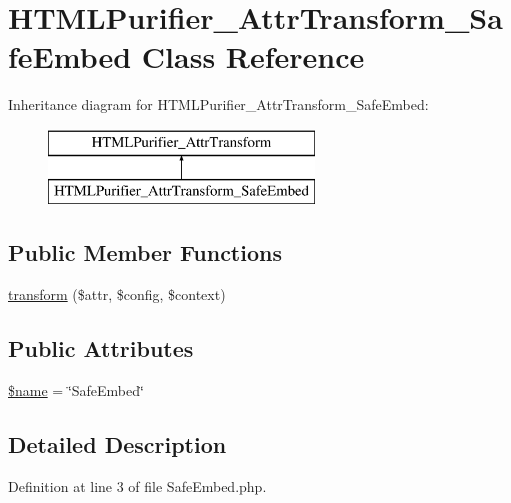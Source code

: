 \hypertarget{classHTMLPurifier__AttrTransform__SafeEmbed}{\section{H\+T\+M\+L\+Purifier\+\_\+\+Attr\+Transform\+\_\+\+Safe\+Embed Class Reference}
\label{classHTMLPurifier__AttrTransform__SafeEmbed}
}
Inheritance diagram for H\+T\+M\+L\+Purifier\+\_\+\+Attr\+Transform\+\_\+\+Safe\+Embed\+:\begin{figure}[H]
\begin{center}
\leavevmode
\includegraphics[height=2.000000cm]{classHTMLPurifier__AttrTransform__SafeEmbed}
\end{center}
\end{figure}
\subsection*{Public Member Functions}
\begin{DoxyCompactItemize}
\item 
\hyperlink{classHTMLPurifier__AttrTransform__SafeEmbed_aaf539f907684bf8769a532fceb2d6626}{transform} (\$attr, \$config, \$context)
\end{DoxyCompactItemize}
\subsection*{Public Attributes}
\begin{DoxyCompactItemize}
\item 
\hyperlink{classHTMLPurifier__AttrTransform__SafeEmbed_a1f81b8fd11a452e0c240da859e4b1e7a}{\$name} = \char`\"{}Safe\+Embed\char`\"{}
\end{DoxyCompactItemize}


\subsection{Detailed Description}


Definition at line 3 of file Safe\+Embed.\+php.



